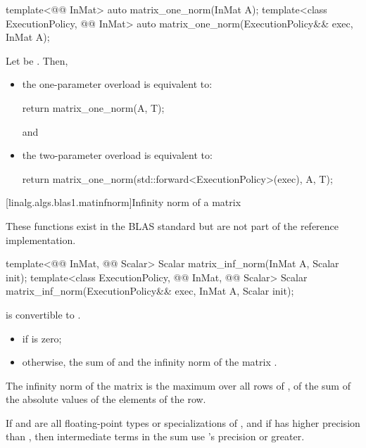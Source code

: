 %
\begin{itemdecl}
template<@@ InMat>
  auto matrix_one_norm(InMat A);
template<class ExecutionPolicy, @@ InMat>
  auto matrix_one_norm(ExecutionPolicy&& exec, InMat A);
\end{itemdecl}

\begin{itemdescr}
\pnum
\effects
Let  be
.
Then,
\begin{itemize}
\item
the one-parameter overload is equivalent to:
\begin{codeblock}
return matrix_one_norm(A, T{});
\end{codeblock}
and
\item
the two-parameter overload is equivalent to:
\begin{codeblock}
return matrix_one_norm(std::forward<ExecutionPolicy>(exec), A, T{});
\end{codeblock}
\end{itemize}
\end{itemdescr}

[linalg.algs.blas1.matinfnorm]{Infinity norm of a matrix}

\pnum
\begin{note}
These functions exist in the BLAS standard\supercite{blas-std}
but are not part of the reference implementation.
\end{note}

%
\begin{itemdecl}
template<@@ InMat, @@ Scalar>
  Scalar matrix_inf_norm(InMat A, Scalar init);
template<class ExecutionPolicy, @@ InMat, @@ Scalar>
  Scalar matrix_inf_norm(ExecutionPolicy&& exec, InMat A, Scalar init);
\end{itemdecl}

\begin{itemdescr}
\pnum
\mandates
{}
is convertible to .

\pnum
\returns
\begin{itemize}
\item
{} if  is zero;
\item
otherwise,
the sum of  and the infinity norm of the matrix .
\end{itemize}
\begin{note}
The infinity norm of the matrix 
is the maximum over all rows of ,
of the sum of the absolute values
of the elements of the row.
\end{note}

\pnum
\remarks
If  and 
are all floating-point types or specializations of ,
and if  has higher precision
than ,
then intermediate terms in the sum use 's precision or greater.
\end{itemdescr}

